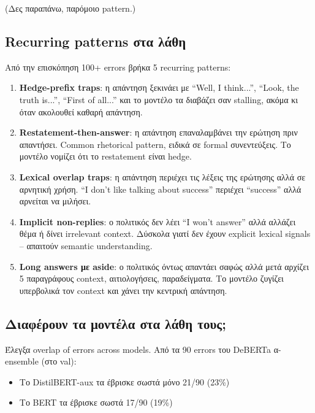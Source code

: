 \documentclass[12pt]{fphw}
\begin{document}
(Δες παραπάνω, παρόμοιο pattern.)

\subsection{Recurring patterns στα λάθη}

Από την επισκόπηση 100+ errors βρήκα 5 recurring patterns:

\begin{enumerate}
    \item \textbf{Hedge-prefix traps}: η απάντηση ξεκινάει με ``Well, I think...'', ``Look, the truth is...'', ``First of all...'' και το μοντέλο τα διαβάζει σαν stalling, ακόμα κι όταν ακολουθεί καθαρή απάντηση.

    \item \textbf{Restatement-then-answer}: η απάντηση επαναλαμβάνει την ερώτηση πριν απαντήσει. Common rhetorical pattern, ειδικά σε formal συνεντεύξεις. Το μοντέλο νομίζει ότι το restatement είναι hedge.

    \item \textbf{Lexical overlap traps}: η απάντηση περιέχει τις λέξεις της ερώτησης αλλά σε αρνητική χρήση. ``I don't like talking about success'' περιέχει ``success'' αλλά αρνείται να μιλήσει.

    \item \textbf{Implicit non-replies}: ο πολιτικός δεν λέει ``I won't answer'' αλλά αλλάζει θέμα ή δίνει irrelevant context. Δύσκολα γιατί δεν έχουν explicit lexical signals -- απαιτούν semantic understanding.

    \item \textbf{Long answers με aside}: ο πολιτικός όντως απαντάει σαφώς αλλά μετά αρχίζει 5 παραγράφους context, αιτιολογήσεις, παραδείγματα. Το μοντέλο ζυγίζει υπερβολικά τον context και χάνει την κεντρική απάντηση.
\end{enumerate}

\subsection{Διαφέρουν τα μοντέλα στα λάθη τους;}

Έλεγξα overlap of errors across models. Από τα 90 errors του DeBERTa α-ensemble (στο val):
\begin{itemize}
    \item Το DistilBERT-aux τα έβρισκε σωστά μόνο 21/90 (23\%)
    \item Το BERT τα έβρισκε σωστά 17/90 (19\%)
\end{itemize}
\end{document}
